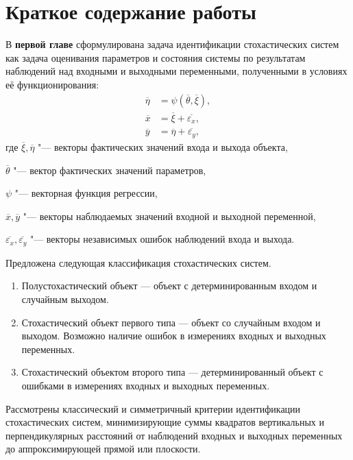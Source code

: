 \section{Краткое содержание работы}

В \textbf{первой главе} сформулирована задача идентификации стохастических систем как
задача оценивания параметров и состояния системы по результатам наблюдений над
входными и выходными переменными, полученными в условиях её функционирования:
\begin{equation*}
  \label{eq:model_general}
  \begin{aligned}
    \overline{\eta} &= \psi (\overline{\theta}, \overline{\xi}), \\
    \overline{x} &= \overline{\xi} + \overline{\varepsilon_x}, \\
    \overline{y} &= \overline{\eta} + \overline{\varepsilon_y},
  \end{aligned}
\end{equation*}
где \( \overline{\xi}, \overline{\eta} \)
"--- векторы фактических значений входа и выхода объекта, \par
\( \overline{\theta} \)
"--- вектор фактических значений параметров, \par
\( \psi \)
"--- векторная функция регрессии, \par
\( \overline{x}, \overline{y} \)
"--- векторы наблюдаемых значений входной и выходной переменной, \par
\( \overline{\varepsilon_x}, \overline{\varepsilon_y} \)
"--- векторы независимых ошибок наблюдений входа и выхода.

Предложена следующая классификация стохастических систем.
\begin{enumerate}
\item Полустохастический объект --- объект с детерминированным входом и
  случайным выходом.
\item Стохастический объект первого типа --- объект со случайным входом и выходом.
  Возможно наличие ошибок в измерениях входных и выходных переменных.
\item Стохастический объектом второго типа --- детерминированный объект с ошибками
  в измерениях входных и выходных переменных.
\end{enumerate}

Рассмотрены классический и симметричный критерии идентификации стохастических систем,
минимизирующие суммы квадратов вертикальных и перпендикулярных расстояний от наблюдений
входных и выходных переменных до аппроксимирующей прямой или плоскости.

